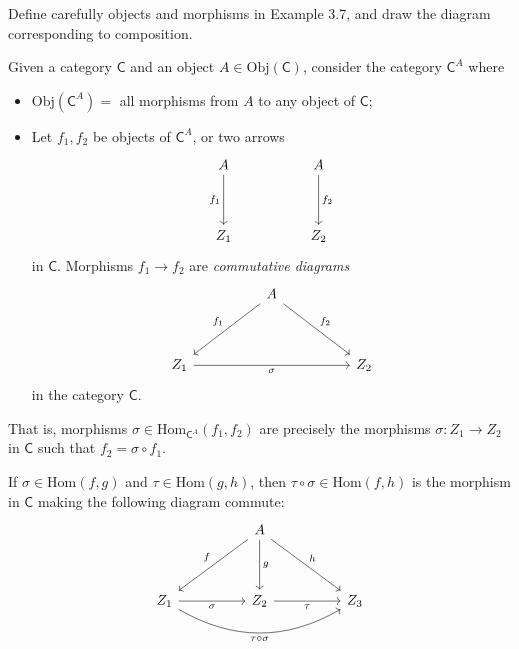 \documentclass[../../master.tex]{subfiles}
\begin{document}
    \begin{problem}
      Define carefully objects and morphisms in Example 3.7, and draw the diagram corresponding to composition.
    \end{problem}

    \begin{solution}
      Given a category \(\mathsf{C}\) and an object \(A \in \text{Obj}(\mathsf{C})\), consider the category \(\mathsf{C}^{A}\) where
      \begin{itemize}
        \item \(\text{Obj}(\mathsf{C}^{A}) =\) all morphisms from \(A\) to any object of \(\mathsf{C}\);
        \item Let \(f_{1}, f_{2}\) be objects of \(\mathsf{C}^{A}\), or two arrows
        \[
        \begin{tikzcd}
	        {A} && {A} \\
	        \\
	        {Z_{1}} && {Z_{2}}
	        \arrow["{f_{1}}"', from=1-1, to=3-1]
	        \arrow["{f_{2}}", from=1-3, to=3-3]
        \end{tikzcd}
        \]
        in \(\mathsf{C}\). Morphisms \(f_{1} \to f_{2}\) are \textit{commutative diagrams}
        \[
        \begin{tikzcd}
	        && {A} \\
          \\
          {Z_{1}} &&&& {Z_{2}}
          \arrow["{f_{1}}"', from=1-3, to=3-1]
	        \arrow["{f_{2}}", from=1-3, to=3-5]
          \arrow["{\sigma}"', from=3-1, to=3-5]
        \end{tikzcd}
        \]
        in the category \(\mathsf{C}\).
      \end{itemize}
      That is, morphisms \(\sigma \in \text{Hom}_{\mathsf{C}^{A}}(f_{1}, f_{2})\)
      are precisely the morphisms \(\sigma: Z_{1} \to Z_{2}\) in \(\mathsf{C}\) such that \(f_{2} = \sigma \circ f_{1}\).

      If \(\sigma \in \text{Hom}(f, g)\) and \(\tau \in \text{Hom}(g, h)\), then \(\tau \circ \sigma \in \text{Hom}(f, h)\) is the morphism in \(\mathsf{C}\) making the following diagram commute:
      \[
      \begin{tikzcd}
	       && {A} \\
	        \\
	        {Z_{1}} && {Z_{2}} && {Z_{3}}
	        \arrow["{f}"', from=1-3, to=3-1]
          \arrow["{g}", from=1-3, to=3-3]
          \arrow["{\sigma}"', from=3-1, to=3-3]
	        \arrow["{h}", from=1-3, to=3-5]
	        \arrow["{\tau}"', from=3-3, to=3-5]
          \arrow["{\tau \circ \sigma}"', from=3-1, to=3-5, bend right=30]
      \end{tikzcd}
      \]
    \end{solution}
\end{document}
